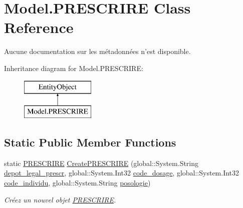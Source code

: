 \hypertarget{class_model_1_1_p_r_e_s_c_r_i_r_e}{\section{Model.\-P\-R\-E\-S\-C\-R\-I\-R\-E Class Reference}
\label{class_model_1_1_p_r_e_s_c_r_i_r_e}
}


Aucune documentation sur les métadonnées n'est disponible.  


Inheritance diagram for Model.\-P\-R\-E\-S\-C\-R\-I\-R\-E\-:\begin{figure}[H]
\begin{center}
\leavevmode
\includegraphics[height=2.000000cm]{class_model_1_1_p_r_e_s_c_r_i_r_e}
\end{center}
\end{figure}
\subsection*{Static Public Member Functions}
\begin{DoxyCompactItemize}
\item 
static \hyperlink{class_model_1_1_p_r_e_s_c_r_i_r_e}{P\-R\-E\-S\-C\-R\-I\-R\-E} \hyperlink{class_model_1_1_p_r_e_s_c_r_i_r_e_aff6d043851452306b1da12b746253874}{Create\-P\-R\-E\-S\-C\-R\-I\-R\-E} (global\-::\-System.\-String \hyperlink{class_model_1_1_p_r_e_s_c_r_i_r_e_a9b74be9f296f7872642b907acd30f857}{depot\-\_\-legal\-\_\-prescr}, global\-::\-System.\-Int32 \hyperlink{class_model_1_1_p_r_e_s_c_r_i_r_e_a7d149f06b9852794be2b5246e0bedaf3}{code\-\_\-dosage}, global\-::\-System.\-Int32 \hyperlink{class_model_1_1_p_r_e_s_c_r_i_r_e_adb817829898cdf62b98e9e3ac19f43ae}{code\-\_\-individu}, global\-::\-System.\-String \hyperlink{class_model_1_1_p_r_e_s_c_r_i_r_e_a1cf3de1e828418d612305ac1a6c62c04}{posologie})
\begin{DoxyCompactList}\small\item\em Créez un nouvel objet \hyperlink{class_model_1_1_p_r_e_s_c_r_i_r_e}{P\-R\-E\-S\-C\-R\-I\-R\-E}. \end{DoxyCompactList}\end{DoxyCompactItemize}

